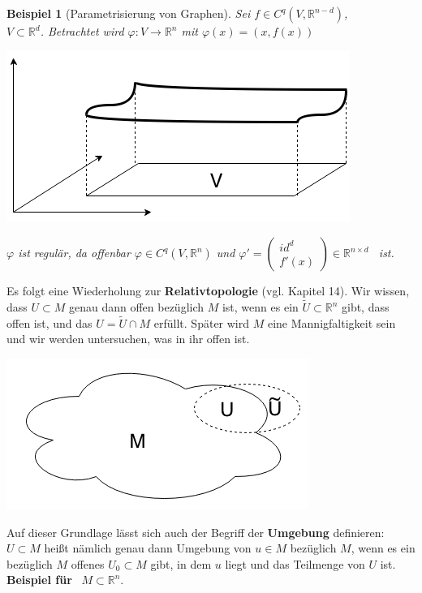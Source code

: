 \documentclass[a4paper,12pt,portrait]{book}
\theoremstyle{theoremstyle}
\newtheorem{beispiel}[theo]{Beispiel}
\begin{document}
\begin{beispiel}[Parametrisierung von Graphen]
Sei $f\in C^q(V,\mathbb{R}^{n-d})$,\\
$V\subset\mathbb{R}^d$. Betrachtet wird $\varphi:V\rightarrow\mathbb{R}^n$ mit $\varphi(x)=(x,f(x))$\\
\begin{center}
\includegraphics[scale=0.5]{pictures/MA2_0005}\\
\end{center}
$\varphi$ ist regulär, da offenbar $\varphi\in C^q(V,\mathbb{R}^n)$ und $\varphi'=\begin{pmatrix}
id^d \\ f'(x)
\end{pmatrix}\in\mathbb{R}^{n\times d}$ \ ist.\\
\linebreak
\end{beispiel}
Es folgt eine Wiederholung zur \textbf{Relativtopologie} (vgl. Kapitel 14). Wir wissen, dass $U\subset M$ genau dann offen bezüglich $M$ ist, wenn es ein $\tilde{U}\subset\mathbb{R}^n$ gibt, dass offen ist, und das $U=\tilde{U}\cap M$ erfüllt. Später wird $M$ eine Mannigfaltigkeit sein und wir werden untersuchen, was in ihr offen ist.\\
\begin{center}
\includegraphics[scale=0.5]{pictures/MA2_0006}\\
\end{center}
Auf dieser Grundlage lässt sich auch der Begriff der \textbf{Umgebung} definieren:\\
$U\subset M$ heißt nämlich genau dann Umgebung von $u\in M$ bezüglich $M$, wenn es ein bezüglich $M$ offenes $U_0\subset M$ gibt, in dem $u$ liegt und das Teilmenge von $U$ ist.\linebreak\linebreak
\newpage
\textbf{\textsf{Beispiel für}} \ $M\subset\mathbb{R}^n$.\\
\end{document}

